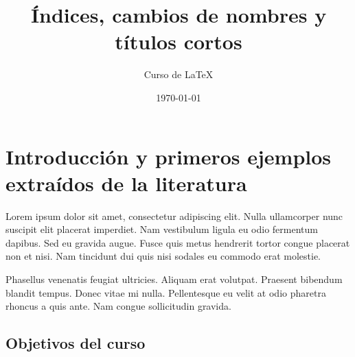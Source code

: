 \documentclass[12pt,a4paper]{report}
\title{Índices, cambios de nombres y títulos cortos}
\author{Curso de \LaTeX}
\date{\today}
\begin{document}



\maketitle 



{\setlength{\parskip}{0pt}
\tableofcontents
}
{\setlength{\parskip}{0pt}
\listoffigures
}
{\setlength{\parskip}{0pt}
\listoftables
}


\chapter{Introducción y primeros ejemplos extraídos de la literatura}
\label{tema.introduccion}



Lorem ipsum dolor sit amet, consectetur adipiscing elit. Nulla ullamcorper nunc suscipit elit placerat imperdiet. Nam vestibulum ligula eu odio fermentum dapibus. Sed eu gravida augue. Fusce quis metus hendrerit tortor congue placerat non et nisi. Nam tincidunt dui quis nisi sodales eu commodo erat molestie. 

Phasellus venenatis feugiat ultricies. Aliquam erat volutpat. Praesent bibendum blandit tempus. Donec vitae mi nulla. Pellentesque eu velit at odio pharetra rhoncus a quis ante. Nam congue sollicitudin gravida. 





\section{Objetivos del curso}
\label{seccion.objetivos}
\end{document}
